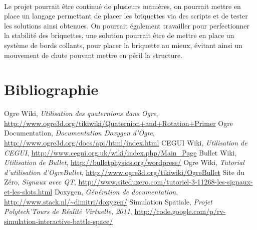 \documentclass[frenchb,twoside]{EPURapport}
\begin{document}
    \

    Le projet pourrait être continué de plusieurs manières, on pourrait mettre
    en place un langage permettant de placer les briquettes via des scripts et
    de tester les solutions ainsi obtenues. On pourrait également travailler pour
    perfectionner la stabilité des briquettes, une solution pourrait être de
    mettre en place un système de bords collants, pour placer la briquette au
    mieux, évitant ainsi un mouvement de chute pouvant mettre en péril la
    structure.



\chapter{Bibliographie}

\begin{bibliographie}	
	 Ogre Wiki, \textit{Utilisation des quaternions dans Ogre}, \url{http://www.ogre3d.org/tikiwiki/Quaternion+and+Rotation+Primer}
	 Ogre Documentation, \textit{Documentation Doxygen d'Ogre}, \url{http://www.ogre3d.org/docs/api/html/index.html}
	 CEGUI Wiki, \textit{Utilisation de CEGUI}, \url{http://www.cegui.org.uk/wiki/index.php/Main_Page}
	 Bullet Wiki, \textit{Utilisation de Bullet}, \url{http://bulletphysics.org/wordpress/}
	 Ogre Wiki, \textit{Tutorial d'utilisation d'OgreBullet}, \url{http://www.ogre3d.org/tikiwiki/OgreBullet}
	 Site du Zéro, \textit{Signaux avec QT}, \url{http://www.siteduzero.com/tutoriel-3-11268-les-signaux-et-les-slots.html}
	 Doxygen, \textit{Génération de documentation}, \url{http://www.stack.nl/~dimitri/doxygen/}
	 Simulation Spatiale, \textit{Projet Polytech'Tours de Réalité Virtuelle, 2011}, \url{http://code.google.com/p/rv-simulation-interactive-battle-space/}
\end{bibliographie}	
\end{document}
